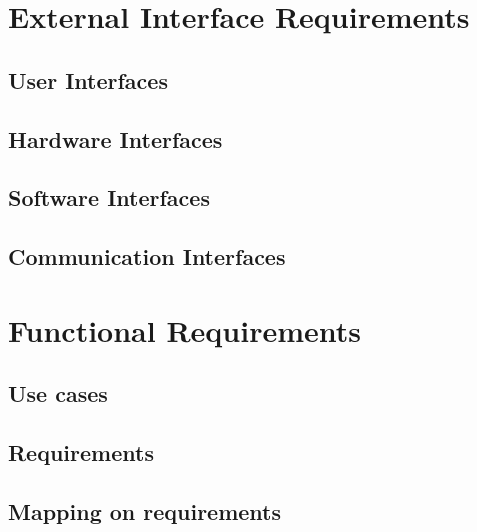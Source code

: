 \section{External Interface Requirements}
\label{sec:External Interface Requirements}%

\subsection{User Interfaces}
\label{sec:user interfaces}%


\subsection{Hardware Interfaces}
\label{sec:hardware interfaces}%


\subsection{Software Interfaces}
\label{sec:software interfaces}%


\subsection{Communication Interfaces}
\label{sec:communication interfaces}%

\section{Functional Requirements}
\label{sec:Functional Requirements}%

\subsection{Use cases}
\label{sec:Use cases}%


\subsection{Requirements}
\label{sec:Requirements}%


\subsection{Mapping on requirements}
\label{sec:Mapping on requirements}


